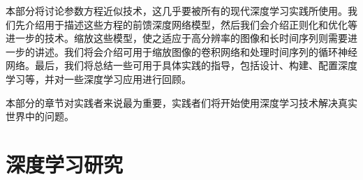 \documentclass[a4paper,11pt]{book}
\numberwithin{equation}{chapter}
\begin{document}
本部分将讨论参数方程近似技术，这几乎要被所有的现代深度学习实践所使用。我们先介绍用于描述这些方程的前馈深度网络模型，然后我们会介绍正则化和优化等进一步的技术。缩放这些模型，使之适应于高分辨率的图像和长时间序列则需要进一步的讲述。我们将会介绍可用于缩放图像的卷积网络和处理时间序列的循环神经网络。最后，我们将总结一些可用于具体实践的指导，包括设计、构建、配置深度学习等，并对一些深度学习应用进行回顾。


本部分的章节对实践者来说最为重要，实践者们将开始使用深度学习技术解决真实世界中的问题。














\part{深度学习研究}
\label{part:3}














\end{document}
